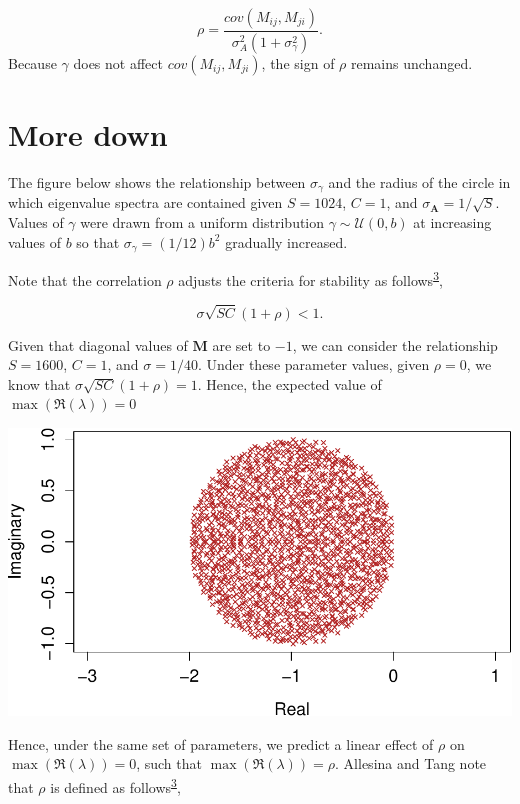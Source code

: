 \documentclass[]{article}
\begin{document}
\[\rho = \frac{cov(M_{ij}, M_{ji})}{\sigma^{2}_{A}(1 + \sigma^{2}_{\gamma})}.\]
Because \(\gamma\) does not affect \(cov(M_{ij}, M_{ji})\), the sign of
\(\rho\) remains unchanged.

\hypertarget{more-down}{%
\section{More down}\label{more-down}}

The figure below shows the relationship between \(\sigma_{\gamma}\) and
the radius of the circle in which eigenvalue spectra are contained given
\(S = 1024\), \(C = 1\), and \(\sigma_{\textbf{A}} = 1/\sqrt{S}\).
Values of \(\gamma\) were drawn from a uniform distribution
\(\gamma \sim \mathcal{U}(0, b)\) at increasing values of \(b\) so that
\(\sigma_{\gamma} = (1/12)b^2\) gradually increased.

Note that the correlation \(\rho\) adjusts the criteria for stability as
follows\textsuperscript{\protect\hyperlink{ref-Allesina2015a}{3}},

\[\sigma\sqrt{SC}\left(1 + \rho\right) < 1.\]

Given that diagonal values of \(\textbf{M}\) are set to \(-1\), we can
consider the relationship \(S = 1600\), \(C = 1\), and
\(\sigma = 1/40\). Under these parameter values, given \(\rho = 0\), we
know that \(\sigma\sqrt{SC}\left(1 + \rho\right) = 1\). Hence, the
expected value of \(\max(\Re(\lambda)) = 0\)

\includegraphics{revision_notes_files/figure-latex/unnamed-chunk-3-1.pdf}

Hence, under the same set of parameters, we predict a linear effect of
\(\rho\) on \(\max(\Re(\lambda)) = 0\), such that
\(\max(\Re(\lambda)) = \rho\). Allesina and Tang note that \(\rho\) is
defined as
follows\textsuperscript{\protect\hyperlink{ref-Allesina2015a}{3}},
\end{document}

